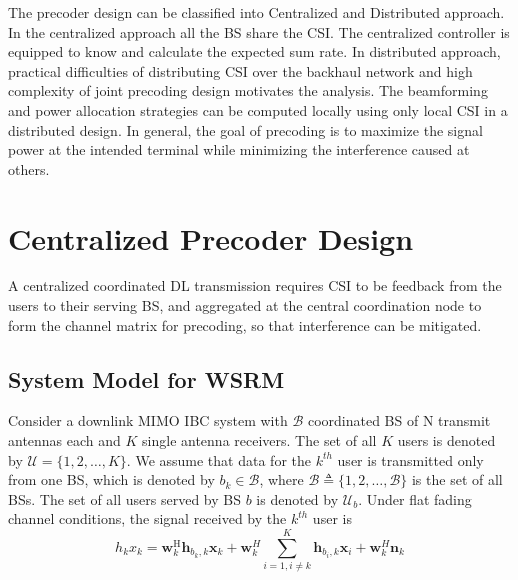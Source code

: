 \documentclass[a4paper, 12pt,titlepage]{dithesis} %
\newcommand{\me}[1]{\( #1 \)}
\newcommand{\mvecH}[2]{\mathbf{#1}^{\mathrm{H}}_{#2}}
\begin{document}
The precoder design can be classified into Centralized and Distributed approach. In the centralized approach all the \ac{BS} share the \ac{CSI}. The centralized controller is equipped to know and calculate the expected sum rate. In distributed approach, practical difficulties of distributing \ac{CSI} over the backhaul network and high complexity of joint precoding design motivates the analysis. The beamforming and power allocation strategies can be computed locally using only local \ac{CSI} in a distributed design. In general, the goal of precoding is to maximize the signal power at the intended terminal while minimizing the interference caused at others. 




\newpage


\chapter{Centralized Precoder Design}

A centralized coordinated \ac{DL} transmission requires \ac{CSI} to be feedback from the users to their serving \ac{BS}, and aggregated at the central coordination node to form the channel matrix for precoding, so that interference can be mitigated.


\section*{System Model for \ac{WSRM} }

Consider a downlink \ac{MIMO} \ac{IBC} system with \me{\mathcal {B}} coordinated \ac{BS} of N transmit antennas each and \me{K} single antenna receivers. The set of all \me{K} users is denoted by \me{\mathcal{U} = \{1,2,\dotsc, K\}}. We assume that data for the \me{k^{th}} user is transmitted only from one BS, which is denoted by \me{b_k \in \mathcal{B}}, where \me{\mathcal{B} \triangleq \{1,2,\dotsc, \mathcal{B}\}} is the set of all \acsp{BS}. The set of all users served by BS \me{b} is denoted by \me{\mathcal{U}_b}. Under flat fading channel conditions, the signal received by the \me{k^{th}} user is
\begin{equation}
h_k{x}_k = \mvecH{w}{k} \mathbf{h}_{{b_k},k} \mathbf{x}_k  + \mathbf{w}^H_k \sum_{i = 1, i \neq k}^{K} \mathbf{h}_{{b_i},k} \mathbf{x}_i + \mathbf{w}^H_k \mathbf{n}_k
\label{cent1_eqn}
\end{equation}
\end{document}
